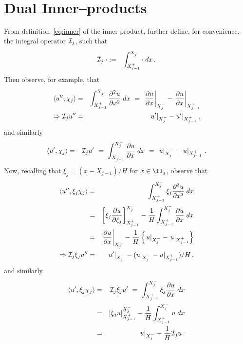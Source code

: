 \documentclass[12pt,a5paper]{article}
\begin{document}
\clearpage
\appendix
\section{Dual Inner--products}\label{sec:inner}
From definition~\eqref{eq:inner} of the inner product, further define, for convenience,
the integral operator ${\cal I}_j$, such that
\begin{eqnarray}
{\cal I}_j\;\cdot & := & \int_{X^+_{j-1}}^{X^-_j}\cdot\;dx\,.
\label{eq:iop}
\end{eqnarray}
Then observe, for example, that
\begin{eqnarray}
\langle u'',\chi_j\rangle & = & \int_{X^+_{j-1}}^{X^-_j}\DD xu\;dx
~=~\left.\D xu\right|_{X^-_j} - \left.\D xu\right|_{X^+_{j-1}}
\\
\Rightarrow {\cal I}_j u'' & = & u'|_{X^-_j}-u'|_{X^+_{j-1}}\,,
\label{eq:udd:chi}
\end{eqnarray}
and similarly
\begin{eqnarray}
\langle u',\chi_j\rangle & = & {\cal I}_j u'
~=~\int_{X^+_{j-1}}^{X^-_j}\D xu\;dx
~=~\left.u\right|_{X^-_j} - \left.u\right|_{X^+_{j-1}}
\,.
\label{eq:ud:chi}
\end{eqnarray}
Now, recalling that $\xi_j=(x-X_{j-1})/H$ for $x\in\II_j$, observe that
\begin{eqnarray}
\langle u'',\xi_j\chi_j\rangle & = & \int_{X^+_{j-1}}^{X^-_j}\xi_j\DD xu\;dx
\nonumber\\
& = & \left[\xi_j\D {\xi_j}u\right]_{X^+_{j-1}}^{X^-_j}
-\frac{1}{H}\int_{X^+_{j-1}}^{X^-_j}\D xu\;dx
\nonumber\\
& = & \left.\D xu\right|_{X^-_j}-\frac{1}{H}\left\{
\left.u\right|_{X^-_j} - \left.u\right|_{X^+_{j-1}}
\right\}
\\
\Rightarrow {\cal I}_j\xi_ju'' & = & u'|_{X^-_j}-(u|_{X^-_j}-u|_{X^+_{j-1}})/H\,,
\label{eq:udd:xi:chi}
\end{eqnarray}
and similarly
\begin{eqnarray}
\langle u',\xi_j\chi_j\rangle & = & {\cal I}_j\xi_ju'
~=~\int_{X^+_{j-1}}^{X^-_j}\xi_j\D xu\;dx
\nonumber\\
& = & \left[\xi_j u\right]_{X^+_{j-1}}^{X^-_j}
-\frac{1}{H}\int_{X^+_{j-1}}^{X^-_j}u\;dx
\nonumber\\
& = & \left.u\right|_{X^-_j}-\frac{1}{H}{\cal I}_j u\,.
\label{eq:ud:xi:chi}
\end{eqnarray}
\end{document}

